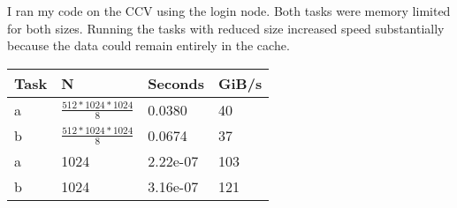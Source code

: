 \documentclass{article}
\begin{document}
I ran my code on the CCV using the login node.
Both tasks were memory limited for both sizes. Running the tasks with reduced size increased speed
substantially because the data could remain entirely in the cache.

\begin{table}[h!]
\begin{tabular}{|l|l|l|l|}
\hline
Task & N                                      & Seconds  & GiB/s \\ \hline
a    & $\frac{512*1024*1024}8$ & 0.0380   & 40   \\ \hline
b    & $\frac{512*1024*1024}8$ & 0.0674   & 37   \\ \hline
a    & 1024                                   & 2.22e-07 & 103   \\ \hline
b    & 1024                                   & 3.16e-07 & 121   \\ \hline
\end{tabular}
\end{table}
\end{document}

